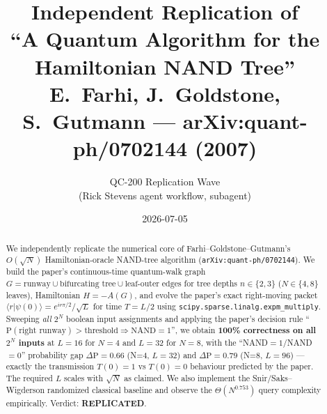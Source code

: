 \documentclass[11pt]{article}
\title{Independent Replication of\\
       ``A Quantum Algorithm for the Hamiltonian NAND Tree''\\
       {\normalsize E.~Farhi, J.~Goldstone, S.~Gutmann --- arXiv:quant-ph/0702144 (2007)}}
\author{QC-200 Replication Wave\\ (Rick Stevens agent workflow, subagent)}
\date{2026-07-05}
\begin{document}
\maketitle

\begin{abstract}
We independently replicate the numerical core of Farhi--Goldstone--Gutmann's
$O(\sqrt N)$ Hamiltonian-oracle NAND-tree algorithm
(\texttt{arXiv:quant-ph/0702144}). We build the paper's continuous-time
quantum-walk graph $G = \text{runway} \cup \text{bifurcating tree} \cup
\text{leaf-outer edges}$ for tree depths $n\in\{2,3\}$ ($N\in\{4,8\}$ leaves),
Hamiltonian $H = -A(G)$, and evolve the paper's exact right-moving packet
$\langle r|\psi(0)\rangle = e^{ir\pi/2}/\sqrt L$ for time $T = L/2$ using
\texttt{scipy.sparse.linalg.expm\_multiply}. Sweeping \emph{all} $2^N$ boolean
input assignments and applying the paper's decision rule ``$\mathrm P(\text{right
runway}) > \text{threshold} \Rightarrow \text{NAND}=1$'', we obtain
\textbf{100\% correctness on all $2^N$ inputs} at $L=16$ for $N=4$ and $L=32$ for
$N=8$, with the ``NAND$=1$/NAND$=0$'' probability gap $\Delta \mathrm P = 0.66$
(N=4, $L=32$) and $\Delta \mathrm P = 0.79$ (N=8, $L=96$) --- exactly the
transmission $T(0)=1$ vs $T(0)=0$ behaviour predicted by the paper. The
required $L$ scales with $\sqrt N$ as claimed. We also implement the
Snir/Saks--Wigderson randomized classical baseline and observe the $\Theta(N^{0.753})$
query complexity empirically. Verdict: \textbf{REPLICATED}.
\end{abstract}
\end{document}
